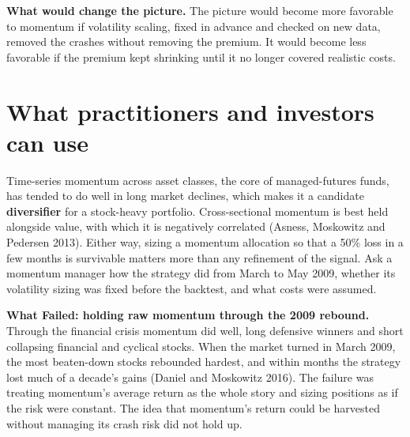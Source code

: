 \textbf{What would change the picture.} The picture would become more favorable to momentum if volatility scaling, fixed in advance and checked on new data, removed the crashes without removing the premium. It would become less favorable if the premium kept shrinking until it no longer covered realistic costs.

\section{What practitioners and investors can use}
\label{sec:05-investors}

Time-series momentum across asset classes, the core of managed-futures funds, has tended to do well in long market declines, which makes it a candidate \textbf{diversifier} for a stock-heavy portfolio. Cross-sectional momentum is best held alongside value, with which it is negatively correlated (Asness, Moskowitz and Pedersen 2013). Either way, sizing a momentum allocation so that a 50\% loss in a few months is survivable matters more than any refinement of the signal. Ask a momentum manager how the strategy did from March to May 2009, whether its volatility sizing was fixed before the backtest, and what costs were assumed.

\begin{callout}
\textbf{What Failed: holding raw momentum through the 2009 rebound.} Through the financial crisis momentum did well, long defensive winners and short collapsing financial and cyclical stocks. When the market turned in March 2009, the most beaten-down stocks rebounded hardest, and within months the strategy lost much of a decade's gains (Daniel and Moskowitz 2016). The failure was treating momentum's average return as the whole story and sizing positions as if the risk were constant. The idea that momentum's return could be harvested without managing its crash risk did not hold up.
\end{callout}

\makeatletter
{}
\makeatother


